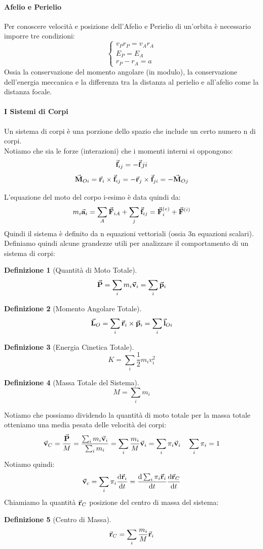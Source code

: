 \documentclass{article}
\newtheorem{defn}{Definizione}[section]
\renewcommand{\a}{\va{a}}
\renewcommand{\v}{\va{v}}
\renewcommand{\r}{\va{r}}
\newcommand{\F}{\va{F}}
\newcommand{\f}{\va{f}}
\newcommand{\M}{\va{M}}
\renewcommand{\l}{\va{l}}
\newcommand{\p}{\va{p}}
\renewcommand{\P}{\va{P}}
\renewcommand{\L}{\va{L}}
\begin{document}
\paragraph{Afelio e Perielio}
Per conoscere velocità e posizione dell'Afelio e Perielio di un'orbita è necessario imporre tre condizioni:
\[\left\{\begin{array}{l}
    v_Pr_P=v_Ar_A  \\
    E_P=E_A  \\
    r_P-r_A=a  
\end{array}\right.\]
Ossia la conservazione del momento angolare (in modulo), la conservazione dell'energia meccanica e la differenza tra la distanza al perielio e all'afelio come la distanza focale.

\paragraph{I Sistemi di Corpi}
Un sistema di corpi è una porzione dello spazio che include un certo numero n di corpi. \\ Notiamo che sia le forze (interazioni) che i momenti interni si oppongono:
\[\f_{ij}=-\f{ji}\]
\[\M_{Oi}=\r_i\times\f_{ij}=-\r_j\times\f_{ji}=-\M_{Oj}\]

L'equazione del moto del corpo i-esimo è data quindi da:
\begin{equation}
    m_i\a_i=\sum_A\F_{iA}+\sum_j\f_{ij}=\F_i^{(e)}+\F^{(i)}
\end{equation}
Quindi il sistema è definito da n equazioni vettoriali (ossia 3n equazioni scalari).
Definiamo quindi alcune grandezze utili per analizzare il comportamento di un sistema di corpi:
\begin{defn}[Quantità di Moto Totale]
\[\P=\sum_im_i\v_i=\sum_i\p_i\]
\end{defn}
\begin{defn}[Momento Angolare Totale]
\[\L_O=\sum_i\r_i\times\p_i=\sum_i\l_{Oi}\]
\end{defn}
\begin{defn}[Energia Cinetica Totale]
\[K=\sum_i\frac{1}{2}m_iv_i^2\]
\end{defn}
\begin{defn}[Massa Totale del Sistema]
\[M=\sum_im_i\]
\end{defn}
Notiamo che possiamo dividendo la quantità di moto totale per la massa totale otteniamo una media pesata delle velocità dei corpi:
\[\v_C=\frac{\P}{M}=\frac{\sum_im_i\v_i}{\sum_im_i}=\sum_i\frac{m_i}{M}\v_i=\sum_i\pi_i\v_i\quad\sum_i\pi_i=1\]
Notiamo quindi:
\[\v_c=\sum_i\pi_i\dv{\r_i}{t}=\dv{\sum_i\pi_i\r_i}{t}\dv{\r_C}{t}\]
Chiamiamo la quantità $\r_C$ posizione del centro di massa del sistema:
\begin{defn}[Centro di Massa]
\[\r_C=\sum_i\frac{m_i}{M}\r_i\]
\end{defn}
\end{document}
